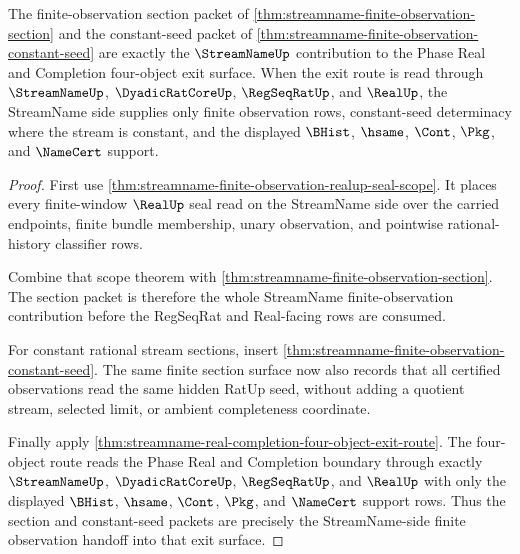 \begin{theorem}
\label{thm:streamname-finite-observation-real-exit-handoff}
The finite-observation section packet of
\autoref{thm:streamname-finite-observation-section} and the constant-seed
packet of \autoref{thm:streamname-finite-observation-constant-seed} are
exactly the $\StreamNameUp$ contribution to the Phase Real and Completion
four-object exit surface. When the exit route is read through
$\StreamNameUp$, $\DyadicRatCoreUp$, $\RegSeqRatUp$, and $\RealUp$, the
StreamName side supplies only finite observation rows, constant-seed
determinacy where the stream is constant, and the displayed $\BHist$,
$\hsame$, $\Cont$, $\Pkg$, and $\NameCert$ support.
\end{theorem}
\begin{proof}
First use \autoref{thm:streamname-finite-observation-realup-seal-scope}. It
places every finite-window $\RealUp$ seal read on the StreamName side over the
carried endpoints, finite bundle membership, unary observation, and pointwise
rational-history classifier rows.

Combine that scope theorem with
\autoref{thm:streamname-finite-observation-section}. The section packet is
therefore the whole StreamName finite-observation contribution before the
RegSeqRat and Real-facing rows are consumed.

For constant rational stream sections, insert
\autoref{thm:streamname-finite-observation-constant-seed}. The same finite
section surface now also records that all certified observations read the same
hidden RatUp seed, without adding a quotient stream, selected limit, or
ambient completeness coordinate.

Finally apply
\autoref{thm:streamname-real-completion-four-object-exit-route}. The
four-object route reads the Phase Real and Completion boundary through exactly
$\StreamNameUp$, $\DyadicRatCoreUp$, $\RegSeqRatUp$, and $\RealUp$ with only
the displayed $\BHist$, $\hsame$, $\Cont$, $\Pkg$, and $\NameCert$ support
rows. Thus the section and constant-seed packets are precisely the
StreamName-side finite observation handoff into that exit surface.
\end{proof}

